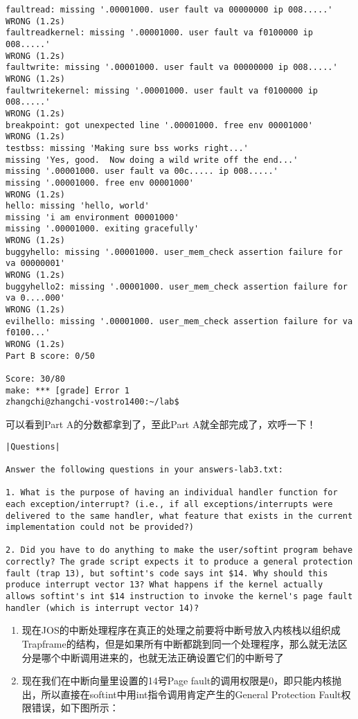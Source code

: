 \documentclass{article}
\begin{document}
\begin{CJK*}{UTF8}{gkai}
\begin{lstlisting}[style=console]
faultread: missing '.00001000. user fault va 00000000 ip 008.....'
WRONG (1.2s)
faultreadkernel: missing '.00001000. user fault va f0100000 ip 008.....'
WRONG (1.2s)
faultwrite: missing '.00001000. user fault va 00000000 ip 008.....'
WRONG (1.2s)
faultwritekernel: missing '.00001000. user fault va f0100000 ip 008.....'
WRONG (1.2s)
breakpoint: got unexpected line '.00001000. free env 00001000'
WRONG (1.2s)
testbss: missing 'Making sure bss works right...'
missing 'Yes, good.  Now doing a wild write off the end...'
missing '.00001000. user fault va 00c..... ip 008.....'
missing '.00001000. free env 00001000'
WRONG (1.2s)
hello: missing 'hello, world'
missing 'i am environment 00001000'
missing '.00001000. exiting gracefully'
WRONG (1.2s)
buggyhello: missing '.00001000. user_mem_check assertion failure for va 00000001'
WRONG (1.2s)
buggyhello2: missing '.00001000. user_mem_check assertion failure for va 0....000'
WRONG (1.2s)
evilhello: missing '.00001000. user_mem_check assertion failure for va f0100...'
WRONG (1.2s)
Part B score: 0/50

Score: 30/80
make: *** [grade] Error 1
zhangchi@zhangchi-vostro1400:~/lab$ 
\end{lstlisting}

可以看到Part A的分数都拿到了，至此Part A就全部完成了，欢呼一下！

\vspace{4em}

\begin{lstlisting}[style=exercise]
|Questions|

Answer the following questions in your answers-lab3.txt:

1. What is the purpose of having an individual handler function for each exception/interrupt? (i.e., if all exceptions/interrupts were delivered to the same handler, what feature that exists in the current implementation could not be provided?)

2. Did you have to do anything to make the user/softint program behave correctly? The grade script expects it to produce a general protection fault (trap 13), but softint's code says int $14. Why should this produce interrupt vector 13? What happens if the kernel actually allows softint's int $14 instruction to invoke the kernel's page fault handler (which is interrupt vector 14)?
\end{lstlisting}

\begin{enumerate}
\item{现在JOS的中断处理程序在真正的处理之前要将中断号放入内核栈以组织成Trapframe的结构，但是如果所有中断都跳到同一个处理程序，那么就无法区分是哪个中断调用进来的，也就无法正确设置它们的中断号了}
\item{现在我们在中断向量里设置的14号Page fault的调用权限是0，即只能内核抛出，所以直接在softint中用int指令调用肯定产生的General Protection Fault权限错误，如下图所示：

}
\end{enumerate}
\end{CJK*}
\end{document}
